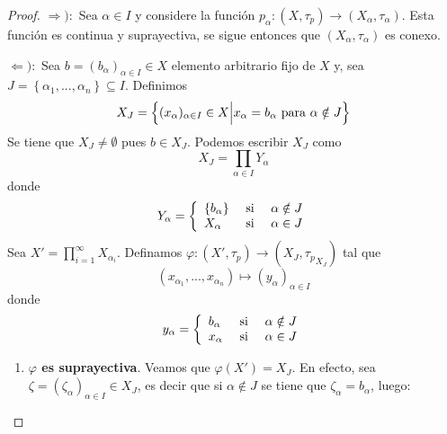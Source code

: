 \documentclass[12pt]{report}
\theoremstyle{largebreak}
\newcommand\cf[3]{\ensuremath{#1:#2\rightarrow#3}}
\begin{document}
    \begin{proof}
        $\Rightarrow):$ Sea $\alpha\in I$ y considere la función $\cf{p_\alpha}{(X,\tau_p)}{(X_\alpha,\tau_\alpha)}$. Esta función es continua y suprayectiva, se sigue entonces que $(X_\alpha,\tau_\alpha)$ es conexo.

        $\Leftarrow):$ Sea $b=(b_\alpha)_{\alpha\in I}\in X$ elemento arbitrario fijo de  $X$ y, sea $J=\left\{\alpha_1,...,\alpha_n \right\}\subseteq I$. Definimos
        \begin{equation*}
            X_J=\left\{(x_\alpha)_{\alpha\in I}\in X\Big|x_\alpha=b_\alpha \textup{ para }\alpha\notin J \right\}
        \end{equation*}
        Se tiene que $X_J\neq\emptyset$ pues $b\in X_J$. Podemos escribir $X_J$ como
        \begin{equation*}
            X_J=\prod_{\alpha\in I}Y_\alpha
        \end{equation*}
        donde
        \begin{equation*}
            Y_\alpha=\left\{
                \begin{array}{lcr}
                    \left\{b_\alpha\right\} & \textup{ si } & \alpha\notin J\\
                    X_\alpha & \textup{ si } & \alpha\in J\\
                \end{array}
            \right.
        \end{equation*}
        Sea $X'=\prod_{i=1}^\infty X_{\alpha_i}$. Definamos $\cf{\varphi}{(X',\tau_p)}{(X_J,{\tau_p}_{X_J})}$ tal que
        \begin{equation*}
            (x_{\alpha_1},...,x_{\alpha_n})\mapsto (y_\alpha)_{\alpha\in I}
        \end{equation*}
        donde
        \begin{equation*}
            y_\alpha=\left\{
                \begin{array}{lcr}
                    b_\alpha & \textup{ si } & \alpha\notin J\\
                    x_\alpha & \textup{ si } & \alpha\in J\\
                \end{array}
            \right.
        \end{equation*}
        \begin{enumerate}
            \item \textbf{$\varphi$ es suprayectiva}. Veamos que $\varphi(X')=X_J$. En efecto, sea $\zeta=(\zeta_{\alpha})_{\alpha\in I}\in X_J$, es decir que si $\alpha\notin J$ se tiene que $\zeta_\alpha=b_\alpha$, luego:

\end{enumerate}
\end{proof}
\end{document}
